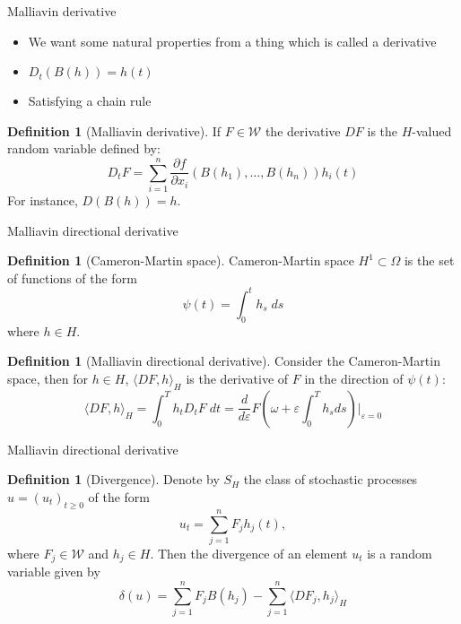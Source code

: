 \documentclass{beamer}%
\theoremstyle{definition}
\newtheorem{mydef}[theorem]{Definition}
\begin{document}



\begin{frame}{Malliavin derivative}
\begin{itemize}
    \item We want some natural properties from a thing which is called a derivative
    \item $D_t(B(h)) = h(t)$
    \item Satisfying a chain rule
\end{itemize}
\begin{mydef}[Malliavin derivative]
If $F \in \mathscr{W}$ the derivative $DF$ is the $H$-valued random variable defined by:
$$
D_tF = \sum_{i=1}^{n} \dfrac{\partial f}{\partial x_i} (B(h_1), \ldots, B(h_n))h_i(t)
$$
For instance, $D(B(h)) = h$.
\end{mydef}

\end{frame}


\begin{frame}{Malliavin directional derivative}
\begin{mydef}[Cameron-Martin space]
Cameron-Martin space $H^1 \subset \Omega$ is the set of functions of the form 
$$
\psi(t) = \int_{0}^{t} h_s\; ds
$$
where $h \in H$.
\end{mydef}

\begin{mydef}[Malliavin directional derivative]
Consider the Cameron-Martin space, then for $h \in H$, $\langle DF,h\rangle_H$ is the derivative of $F$ in the direction of $\psi(t)$:
$$
\langle DF,h\rangle_H = \int_{0}^{T} h_t D_t F\; dt = \dfrac{d}{d\varepsilon}F(\omega + \varepsilon\int_{0}^Th_sds)|_{\varepsilon=0}
$$
\end{mydef}
\end{frame}

\begin{frame}{Malliavin directional derivative}
\begin{mydef}[Divergence]
Denote by $S_H$ the class of stochastic processes $u = (u_t)_{t \geq 0}$ of the form 
$$
u_t = \sum_{j=1}^{n} F_jh_j(t),
$$
where $F_j \in \mathscr{W}$ and $h_j \in H$.
Then the divergence of an element $u_t$ is a random variable given by
$$
\delta(u) = \sum_{j=1}^{n} F_jB(h_j) - \sum_{j=1}^{n} \langle DF_j,h_j\rangle_H
$$
\end{mydef}

\end{frame}
\end{document}
